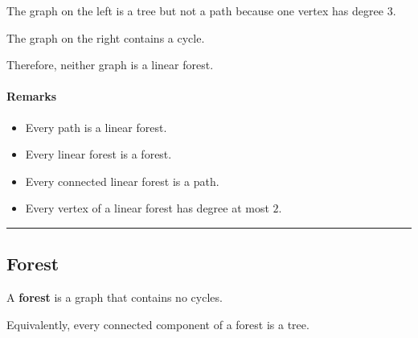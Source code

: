 \documentclass[11pt]{article}
\theoremstyle{plain}
\theoremstyle{definition}
\theoremstyle{remark}
\begin{document}
\begin{center}
\end{center}

The graph on the left is a tree but not a path because one vertex has degree $3$.

The graph on the right contains a cycle.

Therefore, neither graph is a linear forest.

\paragraph{Remarks}

\begin{itemize}
    \item Every path is a linear forest.
    \item Every linear forest is a forest.
    \item Every connected linear forest is a path.
    \item Every vertex of a linear forest has degree at most $2$.
\end{itemize}

\hrule
\subsection*{Forest}

A \textbf{forest} is a graph that contains no cycles.

Equivalently, every connected component of a forest is a tree.
\end{document}
